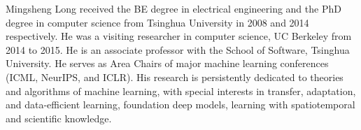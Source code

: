 \documentclass[10pt,journal,compsoc]{IEEEtran}
\begin{document}
\vspace{-30pt}
\begin{IEEEbiography}{Mingsheng Long} received the BE degree in electrical engineering and the PhD degree in computer science from Tsinghua University in 2008 and 2014 respectively. He was a visiting researcher in computer science, UC Berkeley from 2014 to 2015. He is an associate professor with the School of Software, Tsinghua University. He serves as Area Chairs of major machine learning conferences (ICML, NeurIPS, and ICLR). His research is persistently dedicated to theories and algorithms of machine learning, with special interests in transfer, adaptation, and data-efficient learning, foundation deep models, learning with spatiotemporal and scientific knowledge.
\end{IEEEbiography}
\end{document}
